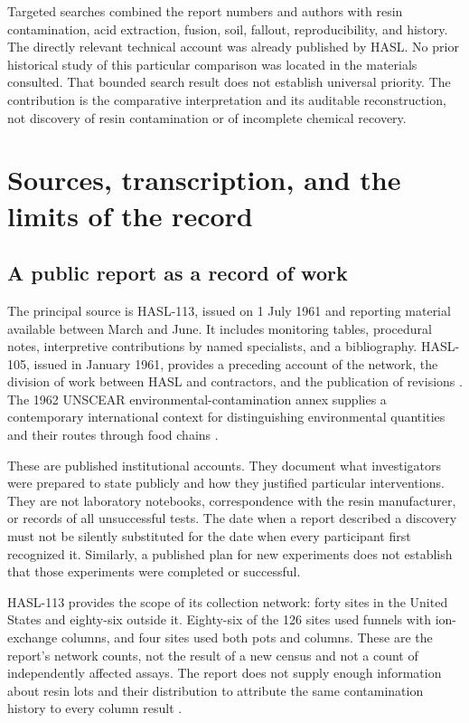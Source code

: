 \documentclass[11pt,a4paper]{article}
\begin{document}
Targeted searches combined the report numbers and authors with resin contamination, acid extraction, fusion, soil, fallout, reproducibility, and history. The directly relevant technical account was already published by HASL. No prior historical study of this particular comparison was located in the materials consulted. That bounded search result does not establish universal priority. The contribution is the comparative interpretation and its auditable reconstruction, not discovery of resin contamination or of incomplete chemical recovery.

\section{Sources, transcription, and the limits of the record}
\subsection{A public report as a record of work}
The principal source is HASL-113, issued on 1 July 1961 and reporting material available between March and June. It includes monitoring tables, procedural notes, interpretive contributions by named specialists, and a bibliography. HASL-105, issued in January 1961, provides a preceding account of the network, the division of work between HASL and contractors, and the publication of revisions \citep{hasl105,hasl113}. The 1962 UNSCEAR environmental-contamination annex supplies a contemporary international context for distinguishing environmental quantities and their routes through food chains \citep{unscear1962}.

These are published institutional accounts. They document what investigators were prepared to state publicly and how they justified particular interventions. They are not laboratory notebooks, correspondence with the resin manufacturer, or records of all unsuccessful tests. The date when a report described a discovery must not be silently substituted for the date when every participant first recognized it. Similarly, a published plan for new experiments does not establish that those experiments were completed or successful.

HASL-113 provides the scope of its collection network: forty sites in the United States and eighty-six outside it. Eighty-six of the 126 sites used funnels with ion-exchange columns, and four sites used both pots and columns. These are the report's network counts, not the result of a new census and not a count of independently affected assays. The report does not supply enough information about resin lots and their distribution to attribute the same contamination history to every column result \citep[pp.~2--3]{hasl113}.
\end{document}
